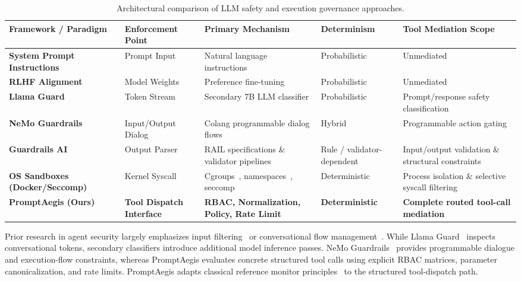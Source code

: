 \documentclass[10pt,twocolumn,letterpaper]{article}
\begin{document}
\begin{table}[t]
\centering
\small
\caption{Architectural comparison of LLM safety and execution governance approaches.}
\label{tab:related_work}
\begin{tabular}{lllll}
\toprule
\textbf{Framework / Paradigm} & \textbf{Enforcement Point} & \textbf{Primary Mechanism} & \textbf{Determinism} & \textbf{Tool Mediation Scope} \\
\midrule
\textbf{System Prompt Instructions}~\cite{perez} & Prompt Input & Natural language instructions & Probabilistic & Unmediated \\
\textbf{RLHF Alignment}~\cite{ouyang} & Model Weights & Preference fine-tuning & Probabilistic & Unmediated \\
\textbf{Llama Guard}~\cite{llamaguard} & Token Stream & Secondary 7B LLM classifier & Probabilistic & Prompt/response safety classification \\
\textbf{NeMo Guardrails}~\cite{nemoguardrails} & Input/Output Dialog & Colang programmable dialog flows & Hybrid & Programmable action gating \\
\textbf{Guardrails AI}~\cite{guardrails} & Output Parser & RAIL specifications \& validator pipelines & Rule / validator-dependent & Input/output validation \& structural constraints \\
\textbf{OS Sandboxes (Docker/Seccomp)}~\cite{merkel,kerrisk_book} & Kernel Syscall & Cgroups~\cite{kerrisk_book,kerrisk_cgroups}, namespaces~\cite{kerrisk_book,kerrisk_namespaces}, seccomp~\cite{kerrisk_seccomp} & Deterministic & Process isolation \& selective syscall filtering \\
\textbf{PromptAegis (Ours)} & \textbf{Tool Dispatch Interface} & \textbf{RBAC, Normalization, Policy, Rate Limit} & \textbf{Deterministic} & \textbf{Complete routed tool-call mediation} \\
\bottomrule
\end{tabular}
\end{table}

Prior research in agent security largely emphasizes input filtering~\cite{perez,llamaguard} or conversational flow management~\cite{nemoguardrails}. While Llama Guard~\cite{llamaguard} inspects conversational tokens, secondary classifiers introduce additional model inference passes. NeMo Guardrails~\cite{nemoguardrails} provides programmable dialogue and execution-flow constraints, whereas PromptAegis evaluates concrete structured tool calls using explicit RBAC matrices, parameter canonicalization, and rate limits. PromptAegis adapts classical reference monitor principles~\cite{anderson,schneider} to the structured tool-dispatch path.
\end{document}
